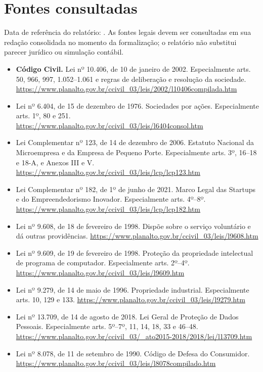 \section*{Fontes consultadas}
\setlength{\emergencystretch}{3em}
Data de referência do relatório: \datareferencia. As fontes legais devem ser consultadas em sua redação consolidada no momento da formalização; o relatório não substitui parecer jurídico ou simulação contábil.
\begin{itemize}[leftmargin=1.2em,itemsep=6pt]
\item \textbf{Código Civil.} Lei nº 10.406, de 10 de janeiro de 2002. Especialmente arts. 50, 966, 997, 1.052--1.061 e regras de deliberação e resolução da sociedade. \url{https://www.planalto.gov.br/ccivil_03/leis/2002/l10406compilada.htm}
\item Lei nº 6.404, de 15 de dezembro de 1976. Sociedades por ações. Especialmente arts. 1º, 80 e 251. \url{https://www.planalto.gov.br/ccivil_03/leis/l6404consol.htm}
\item Lei Complementar nº 123, de 14 de dezembro de 2006. Estatuto Nacional da Microempresa e da Empresa de Pequeno Porte. Especialmente arts. 3º, 16--18 e 18-A, e Anexos III e V. \url{https://www.planalto.gov.br/ccivil_03/leis/lcp/lcp123.htm}
\item Lei Complementar nº 182, de 1º de junho de 2021. Marco Legal das Startups e do Empreendedorismo Inovador. Especialmente arts. 4º--8º. \url{https://www.planalto.gov.br/ccivil_03/leis/lcp/lcp182.htm}
\item Lei nº 9.608, de 18 de fevereiro de 1998. Dispõe sobre o serviço voluntário e dá outras providências. \url{https://www.planalto.gov.br/ccivil_03/leis/l9608.htm}
\item Lei nº 9.609, de 19 de fevereiro de 1998. Proteção da propriedade intelectual de programa de computador. Especialmente arts. 2º--4º. \url{https://www.planalto.gov.br/ccivil_03/leis/l9609.htm}
\item Lei nº 9.279, de 14 de maio de 1996. Propriedade industrial. Especialmente arts. 10, 129 e 133. \url{https://www.planalto.gov.br/ccivil_03/leis/l9279.htm}
\item Lei nº 13.709, de 14 de agosto de 2018. Lei Geral de Proteção de Dados Pessoais. Especialmente arts. 5º--7º, 11, 14, 18, 33 e 46--48. \url{https://www.planalto.gov.br/ccivil_03/_ato2015-2018/2018/lei/l13709.htm}
\item Lei nº 8.078, de 11 de setembro de 1990. Código de Defesa do Consumidor. \url{https://www.planalto.gov.br/ccivil_03/leis/l8078compilado.htm}

\end{itemize}
